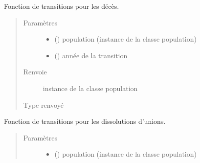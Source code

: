 \documentclass[letterpaper,10pt,french]{sphinxmanual}
\begin{document}
\begin{fulllineitems}
\begin{fulllineitems}
\begin{quote}
\begin{description}
\end{description}\end{quote}

\end{fulllineitems}


\begin{fulllineitems}
\label{\detokenize{code:simgen.update.dead}}
Fonction de transitions pour les décès.
\begin{quote}\begin{description}
\item[{Paramètres}] \leavevmode\begin{itemize}
\item {} 
 ({\hyperref[\detokenize{code:simgen.population}]{}}) \textendash{} population (instance de la classe population)

\item {} 
 () \textendash{} année de la transition

\end{itemize}

\item[{Renvoie}] \leavevmode
instance de la classe population

\item[{Type renvoyé}] \leavevmode
{\hyperref[\detokenize{code:simgen.population}]{}}

\end{description}\end{quote}

\end{fulllineitems}


\begin{fulllineitems}
\label{\detokenize{code:simgen.update.divorce}}
Fonction de transitions pour les dissolutions d’unions.
\begin{quote}\begin{description}
\item[{Paramètres}] \leavevmode\begin{itemize}
\item {} 
 ({\hyperref[\detokenize{code:simgen.population}]{}}) \textendash{} population (instance de la classe population)


\end{itemize}
\end{description}
\end{quote}
\end{fulllineitems}
\end{fulllineitems}
\end{document}
